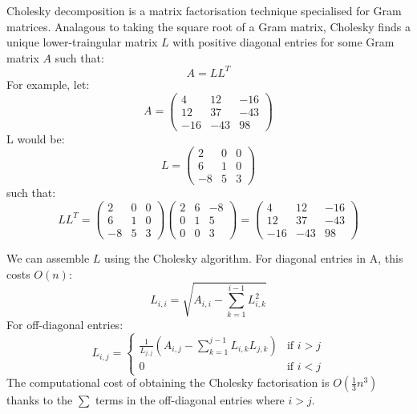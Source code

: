Cholesky decomposition \cite{gp-ml} is a matrix factorisation technique specialised for Gram matrices. Analagous to taking the square root of a Gram matrix, Cholesky finds a unique lower-traingular matrix $L$ with positive diagonal entries for some Gram matrix $A$ such that:
\begin{equation} \label{eq:cholesky-factor}
    A = LL^T
\end{equation}
For example, let:
\begin{equation*}
    A = \begin{pmatrix}
        4 & 12 & -16 \\ 
        12 & 37 & -43 \\
        -16 & -43 & 98
    \end{pmatrix}
\end{equation*}
L would be:
\begin{equation*}
    L = \begin{pmatrix}
        2 & 0 & 0 \\
        6 & 1 & 0 \\
        -8 & 5 & 3 
    \end{pmatrix}
\end{equation*}
such that:
\begin{equation*}
    LL^T = \begin{pmatrix}
        2 & 0 & 0 \\
        6 & 1 & 0 \\
        -8 & 5 & 3 
    \end{pmatrix} \begin{pmatrix}
        2 & 6 & -8 \\
        0 & 1 & 5 \\
        0 & 0 & 3 
    \end{pmatrix} = \begin{pmatrix}
        4 & 12 & -16 \\ 
        12 & 37 & -43 \\
        -16 & -43 & 98
    \end{pmatrix}
\end{equation*}

We can assemble $L$ using the Cholesky algorithm. \cite{big-data} For diagonal entries in A, this costs $O(n)$:
\begin{equation*}
    L_{i,i} = \sqrt{A_{i,i} - \sum_{k=1}^{i-1} L_{i,k}^2}
\end{equation*}
For off-diagonal entries:
\begin{equation*}
    L_{i,j} = \begin{cases}
        \frac{1}{L_{j,j}} \left( A_{i,j} - \sum_{k=1}^{j-1} L_{i,k} L_{j,k} \right) & \text{if } i > j \\
        0 & \text{if } i < j
    \end{cases}
\end{equation*}
The computational cost of obtaining the Cholesky factorisation is $O(\frac{1}{3} n^3)$ thanks to the $\sum$ terms in the off-diagonal entries where $i > j$.

